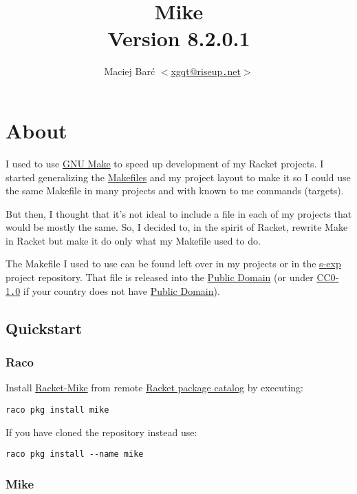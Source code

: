 \documentclass{article}
\newcommand{\sectionNewpage}{}
\newcommand{\preDoc}{}
\newcommand{\Scribtexttt}[1]{{\texttt{#1}}}
\newcommand{\titleAndVersionAndAuthors}[3]{\title{#1\\{\normalsize \SVersionBefore{}#2}}\author{#3}\maketitle}
\newcommand{\SAuthor}[1]{#1}
\newcommand{\SVersionBefore}[1]{Version }
\newcommand{\SNumberOfAuthors}[1]{}
\let\SOriginalthesubsection\thesubsection
\let\SOriginalthesubsubsection\thesubsubsection
\newcommand{\Ssection}[2]{\section[#1]{#2}\let\thesubsection\SOriginalthesubsection}
\newcommand{\Ssubsection}[2]{\subsection[#1]{#2}\let\thesubsubsection\SOriginalthesubsubsection}
\newcommand{\Ssubsubsection}[2]{\subsubsection[#1]{#2}}
\renewcommand{\sectionNewpage}{\newpage}
\renewcommand{\preDoc}{\sloppy}
\begin{document}
\preDoc
\titleAndVersionAndAuthors{Mike}{8.2.0.1}{\SNumberOfAuthors{1}\SAuthor{Maciej Bar\'{c} $<$\href{mailto:xgqt@riseup.net}{xgqt@riseup{\hbox{\texttt{.}}}net}$>$}}
\label{t:x28part_x22mikex22x29}



\newpage \tableofcontents \newpage

\sectionNewpage

\Ssection{About}{About}\label{t:x28part_x22mikex2daboutx22x29}

I used to use \href{https://www.gnu.org/software/make/}{GNU Make}
to speed up development of my Racket projects.
I started generalizing the
\href{https://www.gnu.org/prep/standards/html_node/Makefile-Conventions.html}{Makefiles}
and my project layout to make it so
I could use the same Makefile in many projects
and with known to me commands (targets).

But then, I thought that it{'}s not ideal to include a file in each of my projects
that would be mostly the same. So, I decided to, in the spirit of Racket,
rewrite Make in Racket but make it do only what my Makefile used to do.

The Makefile I used to use can be found left over in my projects or in the
\href{https://gitlab.com/xgqt/s-exp/-/blob/master/buildsystems/Makefile}{s{-}exp}
project repository. That file is released into the
\href{https://creativecommons.org/share-your-work/public-domain/}{Public Domain}
(or under
   \href{https://spdx.org/licenses/CC0-1.0.html}{CC0{-}1{\hbox{\texttt{.}}}0}
   if your country does not have
   \href{https://en.wikipedia.org/wiki/Public_domain}{Public Domain}).

\Ssubsection{Quickstart}{Quickstart}\label{t:x28part_x22Quickstartx22x29}



\Ssubsubsection{Raco}{Raco}\label{t:x28part_x22Racox22x29}

Install \href{https://gitlab.com/xgqt/racket-mike}{Racket{-}Mike}
from remote
\href{https://pkgs.racket-lang.org/package/mike}{Racket package catalog}
by executing:


\noindent \mbox{\hphantom{\Scribtexttt{xx}}}\Scribtexttt{raco pkg install mike}

If you have cloned the repository instead use:


\noindent \mbox{\hphantom{\Scribtexttt{xx}}}\Scribtexttt{raco pkg install {-}{-}name mike}

\Ssubsubsection{Mike}{Mike}\label{t:x28part_x22Mikex22x29}
\end{document}
